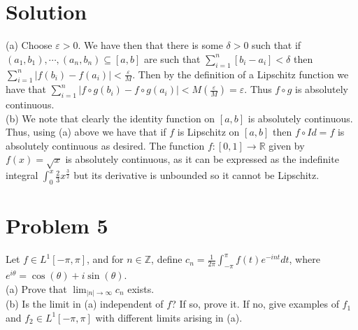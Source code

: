 \documentclass{article}
\begin{document}
\section*{Solution}
(a) Choose $\varepsilon>0$.  We have then that there is some $\delta>0$ such that if $(a_1,b_1),\cdots,(a_n,b_n)\subseteq[a,b]$ are such that $\sum_{i=1}^n[b_i-a_i]<\delta$ then $\sum_{i=1}^n|f(b_i)-f(a_i)|<\frac{\varepsilon}{M}$.  Then by the definition of a Lipschitz function we have that $\sum_{i=1}^n|f\circ g(b_i)-f\circ g(a_i)|<M(\frac{\varepsilon}{M})=\varepsilon$.  Thus $f\circ g$ is absolutely continuous.\\

\noindent (b) We note that clearly the identity function on $[a,b]$ is absolutely continuous.  Thus, using (a) above we have that if $f$ is Lipschitz on $[a,b]$ then $f\circ Id=f$ is absolutely continuous as desired.  The function $f:[0,1]\rightarrow\mathbb{R}$ given by $f(x)=\sqrt{x}$ is absolutely continuous, as it can be expressed as the indefinite integral $\int_0^x\frac{2}{3}x^\frac{3}{2}$ but its derivative is unbounded so it cannot be Lipschitz.\\

\section*{Problem 5}
Let $f\in L^1[-\pi,\pi]$, and for $n\in\mathbb{Z}$, define $c_n=\frac{1}{2\pi}\int_{-\pi}^\pi f(t)e^{-int}dt$, where $e^{i\theta}=\cos(\theta)+i\sin(\theta)$.\\

\noindent (a) Prove that $\lim_{|n|\rightarrow\infty}c_n$ exists.\\

\noindent (b) Is the limit in (a) independent of $f$? If so, prove it.  If no, give examples of $f_1$ and $f_2\in L^1[-\pi,\pi]$ with different limits arising in (a).
\end{document}
